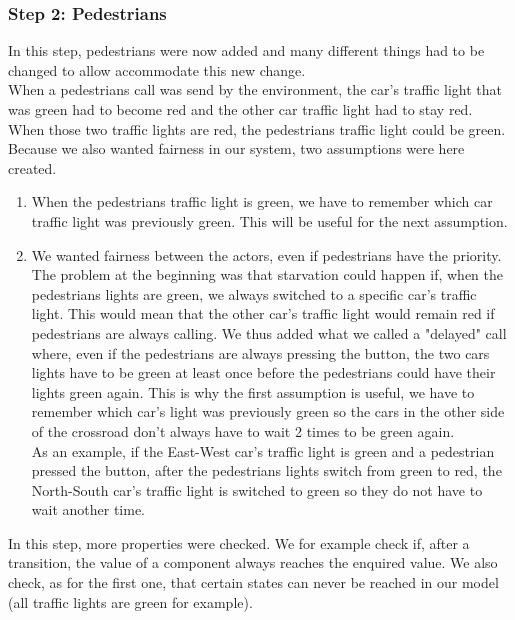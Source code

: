 \subsubsection{Step 2: Pedestrians}
In this step, pedestrians were now added and many different things had to be changed to allow accommodate this new change. \\ 

When a pedestrians call was send by the environment, the car's traffic light that was green had to become red and the other car traffic light had to stay red. When those two traffic lights are red, the pedestrians traffic light could be green. Because we also wanted fairness in our system, two assumptions were here created.
\begin{enumerate}
    \item When the pedestrians traffic light is green, we have to remember which car traffic light was previously green. This will be useful for the next assumption.
    \item We wanted fairness between the actors, even if pedestrians have the priority. The problem at the beginning was that starvation could happen if, when the pedestrians lights are green, we always switched to a specific car's traffic light. This would mean that the other car's traffic light would remain red if pedestrians are always calling. We thus added what we called a "delayed" call where, even if the pedestrians are always pressing the button, the two cars lights have to be green at least once before the pedestrians could have their lights green again. This is why the first assumption is useful, we have to remember which car's light was previously green so the cars in the other side of the crossroad don't always have to wait 2 times to be green again. \\
    As an example, if the East-West car's traffic light is green and a pedestrian pressed the button, after the pedestrians lights switch from green to red, the North-South car's traffic light is switched to green so they do not have to wait another time.
\end{enumerate}
In this step, more properties were checked. We for example check if, after a transition, the value of a component always reaches the enquired value. We also check, as for the first one, that certain states can never be reached in our model (all traffic lights are green for example).

